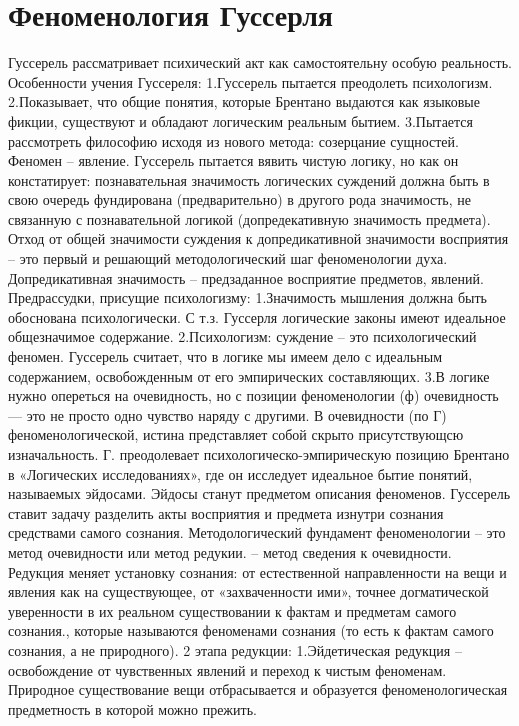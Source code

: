 \documentclass[12pt]{article}
\begin{document}
\newpage
\section{Феноменология Гуссерля}
Гуссерель  рассматривает  психический  акт  как  самостоятельну  особую  реальность.  Особенности  учения
Гуссереля:
1.Гуссерель пытается преодолеть психологизм.
2.Показывает, что общие понятия, которые Брентано выдаются как языковые фикции, существуют и обладают
логическим реальным бытием.
3.Пытается рассмотреть философию исходя из нового метода: созерцание сущностей.
Феномен – явление.
Гуссерель пытается вявить чистую логику, но как он констатирует: познавательная значимость логических
суждений должна быть в свою очередь фундирована (предварительно) в другого рода значимость, не связанную
с познавательной логикой (допредекативную значимость предмета). Отход от общей значимости суждения к
допредикативной значимости восприятия – это первый и решающий методологический шаг феноменологии
духа. Допредикативная значимость – предзаданное восприятие предметов, явлений.
Предрассудки, присущие психологизму:
1.Значимость мышления должна быть обоснована психологически. С т.з. Гуссерля логические законы имеют
идеальное общезначимое содержание.
2.Психологизм: суждение – это психологический феномен. Гуссерель считает, что в логике мы имеем дело с
идеальным содержанием, освобожденным от его эмпирических составляющих.
3.В логике нужно опереться на очевидность, но с позиции феноменологии (ф) очевидность — это не просто
одно чувство наряду с другими. В очевидности (по Г) феноменологической, истина представляет собой скрыто
присутствующсю  изначальность.  Г.  преодолевает  психологическо-эмпирическую  позицию  Брентано  в
«Логических  исследованиях»,  где  он  исследует  идеальное  бытие  понятий,  называемых  эйдосами.  Эйдосы
станут предметом описания феноменов.
Гуссерель ставит задачу разделить акты восприятия и предмета изнутри сознания средствами самого сознания.
Методологический фундамент феноменологии – это метод очевидности или метод редукии. – метод сведения к
очевидности.
Редукция  меняет  установку  сознания:  от  естественной  направленности  на  вещи  и  явления  как  на
существующее, от «захваченности ими», точнее догматической уверенности в их реальном существовании к
фактам и предметам самого сознания., которые называются феноменами сознания (то есть к фактам самого
сознания, а не природного).
2 этапа редукции:
1.Эйдетическая редукция – освобождение от чувственных явлений и переход к чистым феноменам. Природное
существование вещи отбрасывается и образуется феноменологическая предметность в которой можно прежить.
\end{document}
